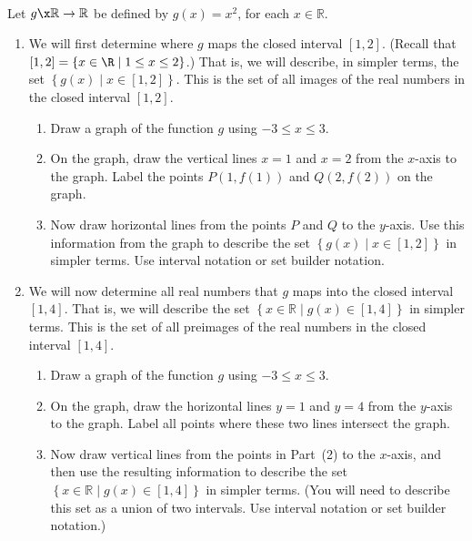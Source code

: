 \begin{previewactivity} \label{PA:functionsandint} \hfill \\
Let $g\x \mathbb{R} \to \mathbb{R}$ be defined by $g ( x ) = x^2$, for each 
$x \in \mathbb{R}$.

\begin{enumerate}
\item We will first determine where $g$ maps the closed interval $\left[ 1, 2 \right]$.  (Recall that 
$[1, 2] = \left\{ x \in \R \mid 1 \leq x \leq 2 \right\}$.)  That is, we will describe, in simpler terms, the set 
$\left\{ g ( x ) \mid x \in \left[ 1, 2 \right] \right\}$.  This is the set of all images of the real numbers in the closed interval $\left[ 1, 2 \right]$.

\begin{enumerate}
\item Draw a graph of the function $g$ using $-3 \leq x \leq 3$.

\item On the graph, draw the vertical lines $x = 1$ and $x = 2$ from the $x$-axis to the graph.   Label the points $P \!\left(1, f ( 1 ) \right)$ and 
$Q \!\left(2, f ( 2 ) \right)$ on the graph.

\item Now draw horizontal lines from the points $P$ and $Q$ to the $y$-axis.  Use this information from the graph to describe the set 
$\left\{ g ( x ) \mid x \in \left[ 1, 2 \right] \right\}$ in simpler terms.  Use interval notation or set builder notation.
\end{enumerate}

\item We will now determine all real numbers that $g$ maps into the closed interval 
$\left[ 1, 4 \right]$.  That is, we will describe the set 
$\left\{ x \in \mathbb{R} \mid g ( x ) \in \left[ 1, 4 \right] \right\}$ in simpler terms.  This is the set of all preimages of the real numbers in the closed interval $\left[ 1, 4 \right]$.

\begin{enumerate}
\item Draw a graph of the function $g$ using $-3 \leq x \leq 3$.

\item On the graph, draw the horizontal lines $y = 1$ and $y = 4$ from the $y$-axis to the graph.   Label all points where these two lines intersect the graph.

\item Now draw vertical lines from the points in Part~(2) to the $x$-axis, and then use the resulting information  to describe the set \linebreak
$\left\{ x \in \mathbb{R} \mid g ( x ) \in \left[ 1, 4 \right] \right\}$ in simpler terms.  (You will need to describe this set as a union of two intervals.  Use interval notation or set builder notation.)
\end{enumerate}
\end{enumerate}
\end{previewactivity}
\hbreak

\endinput
